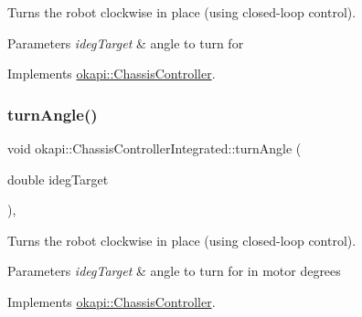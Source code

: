 Turns the robot clockwise in place (using closed-\/loop control).


\begin{DoxyParams}{Parameters}
{\em ideg\+Target} & angle to turn for \\
\hline
\end{DoxyParams}


Implements \mbox{\hyperlink{classokapi_1_1ChassisController_aab12308b3fad6793c007d7a33730a3f7}{okapi\+::\+Chassis\+Controller}}.

\mbox{\label{classokapi_1_1ChassisControllerIntegrated_a3f13749508bf420468ffdb54f62a9da2}} 
\subsubsection{\texorpdfstring{turnAngle()}{turnAngle()}\hspace{0.1cm}{\footnotesize\ttfamily [2/2]}}
{\footnotesize\ttfamily void okapi\+::\+Chassis\+Controller\+Integrated\+::turn\+Angle (\begin{DoxyParamCaption}\item[{double}]{ideg\+Target }\end{DoxyParamCaption})\hspace{0.3cm}{\ttfamily [override]}, {\ttfamily [virtual]}}

Turns the robot clockwise in place (using closed-\/loop control).


\begin{DoxyParams}{Parameters}
{\em ideg\+Target} & angle to turn for in motor degrees \\
\hline
\end{DoxyParams}


Implements \mbox{\hyperlink{classokapi_1_1ChassisController_a6aca227e35ececd02eed1cc42d09ad1d}{okapi\+::\+Chassis\+Controller}}.

\mbox{\label{classokapi_1_1ChassisControllerIntegrated_a773a99fe7a1540da856ad6b6008ba24f}} 
